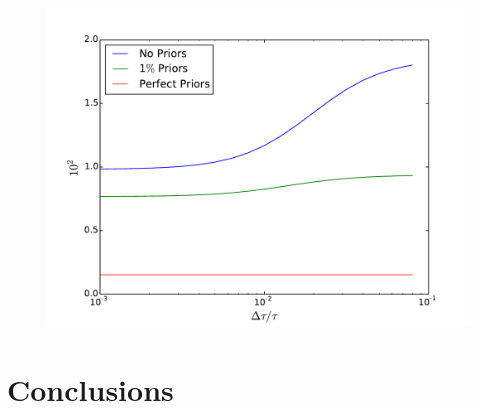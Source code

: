 \documentclass[aps,prl,preprint,groupedaddress]{revtex4-1}
\begin{document}
\begin{figure}[htbp]
\begin{center}
\includegraphics[scale=0.6]{tau_fisher.pdf}
\caption{}
\label{fig:phi-cl-noise}
\end{center}
\end{figure}



\section{Conclusions}




%

\end{document}
